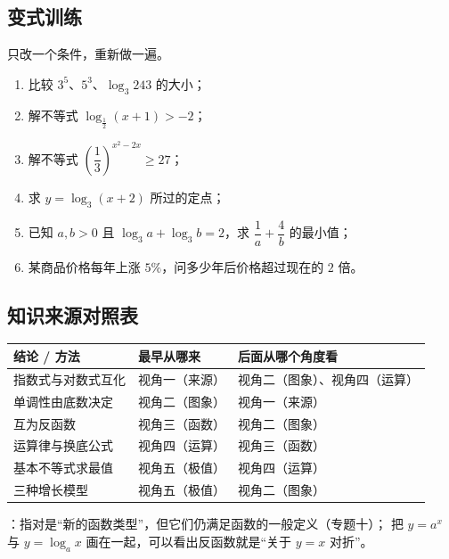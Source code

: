 \begin{inclasstest}
\subsection{变式训练}
只改一个条件，重新做一遍。
\begin{enumerate}
  \item 比较 $3^5$、$5^3$、$\log_3 243$ 的大小；
  \item 解不等式 $\log_{\frac12}(x+1)>-2$；
  \item 解不等式 $\left(\dfrac13\right)^{x^2-2x}\geq27$；
  \item 求 $y=\log_3(x+2)$ 所过的定点；
  \item 已知 $a,b>0$ 且 $\log_3 a+\log_3 b=2$，求 $\dfrac1a+\dfrac4b$ 的最小值；
  \item 某商品价格每年上涨 $5\%$，问多少年后价格超过现在的 $2$ 倍。
\end{enumerate}
\end{inclasstest}

\begin{afterclass}
\subsection{知识来源对照表}
\begin{center}
\footnotesize
\setlength{\tabcolsep}{4pt}
\renewcommand{\arraystretch}{1.35}
\begin{tabular}{p{3.4cm}p{4.0cm}p{5.6cm}}
\toprule
结论 / 方法 & 最早从哪来 & 后面从哪个角度看 \\
\midrule
指数式与对数式互化 & 视角一（来源） & 视角二（图象）、视角四（运算） \\
单调性由底数决定 & 视角二（图象） & 视角一（来源） \\
互为反函数 & 视角三（函数） & 视角二（图象） \\
运算律与换底公式 & 视角四（运算） & 视角三（函数） \\
基本不等式求最值 & 视角五（极值） & 视角四（运算） \\
三种增长模型 & 视角五（极值） & 视角二（图象） \\
\bottomrule
\end{tabular}
\end{center}

：指对是“新的函数类型”，但它们仍满足函数的一般定义（专题十）；
把 $y=a^x$ 与 $y=\log_a x$ 画在一起，可以看出反函数就是“关于 $y=x$ 对折”。
\end{afterclass}
